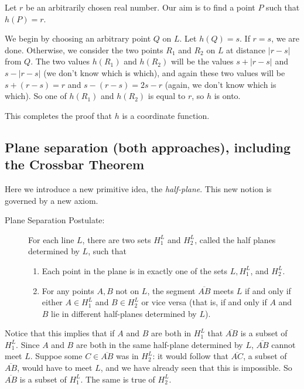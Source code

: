 \documentclass[12pt]{article}
\begin{document}
\begin{description}
Let $r$ be an arbitrarily chosen real number.  Our aim is to find a point $P$ such that $h(P)=r$.

We begin by choosing an arbitrary point $Q$ on $L$.  Let $h(Q)=s$.  If $r=s$, we are done.  Otherwise, we consider the two points $R_1$ and $R_2$ on $L$ at distance $|r-s|$ from $Q$.  The two values
$h(R_1)$ and $h(R_2)$ will be the values $s+|r-s|$ and $s-|r-s|$ (we don't know which is which), and again these two values will be $s+(r-s)=r$ and $s-(r-s) = 2s-r$  (again, we don't know which is which).
So one of $h(R_1)$ and $h(R_2)$ is equal to $r$, so $h$ is onto.

This completes the proof that $h$ is a coordinate function.




\end{description}

\subsection{Plane separation (both approaches), including the Crossbar Theorem}  Here we introduce a new primitive idea, the {\em half-plane\/}.  This new notion is governed by a new axiom.

\begin{description}

\item[Plane Separation Postulate:]  For each line $L$, there are two sets $H^L_1$ and $H^L_2$, called the half planes determined by $L$,  such that 

\begin{enumerate}

\item Each point in the plane is in exactly one of the sets $L, H^L_1$, and $H^L_2$.

\item For any points $A,B$ not on $L$, the segment $\overline{AB}$ meets $L$ if and only if either $A \in H^L_1$ and $B \in H^L_2$ or vice versa (that is, if and only if
$A$ and $B$ lie in different half-planes determined by $L$).

\end{enumerate}

\end{description}

Notice that this implies that if $A$ and $B$ are both in $H^L_1$ that $\overline{AB}$ is a subset of $H^L_1$.  Since $A$ and $B$ are both in the same half-plane determined by $L$,
$\overline{AB}$ cannot meet $L$.  Suppoe some $C \in \overline{AB}$ was in $H^L_2$:  it would follow that $\overline{AC}$, a subset of $\overline{AB}$, would have to meet $L$,
and we have already seen that this is impossible.  So $\overline{AB}$ is a subset of $H^L_1$.  The same is true of $H^L_2$.
\end{document}
